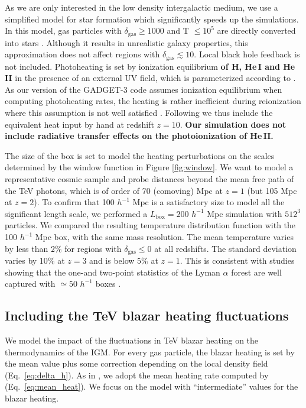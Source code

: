 \documentclass[numberedappendix]{emulateapj}
\newcommand\ALc[1]{{\color{red} \bf #1}} %
\begin{document}
As we are only interested in the low density intergalactic medium, we use a simplified model for star formation which significantly speeds up the simulations. In this model, gas particles with $\delta_{\mathrm{gas}}\geq 1000$ and T $\leq 10^5$ are directly converted into stars \citep{2004MNRAS.354..684V}. Although it results in unrealistic galaxy properties, this approximation does not affect regions with $\delta_{\mathrm{gas}} \lesssim 10$. Local black hole feedback is not included. Photoheating is set by ionization equilibrium \ALc{of H, He\,\textsc{I} and He\,\textsc{II}} in the presence of an external UV field, which is parameterized according to \citet{2009ApJ...703.1416F}. As our version of the \textsc{GADGET-3} code assumes ionization equilibrium when computing photoheating rates, the heating is rather inefficient during reionization where this assumption is not well satisfied \citep[see e.g.][]{2014arXiv1410.1531P}. Following \citet{2012MNRAS.423..149P} we thus include the equivalent heat input by hand at redshift $z=10$. \ALc{Our simulation does not include radiative transfer effects on the photoionization of He\,\textsc{II}.}

The size of the box is set to model the heating perturbations on the scales determined by the window function in Figure \ref{fig:window}. We want to model a representative cosmic sample and probe distances beyond the mean free path of the TeV photons, which is of order of 70 (comoving) Mpc at $z=1$ (but 105 Mpc at $z=2$). To confirm that 100 $h^{-1}$ Mpc is a satisfactory size to model all the significant length scale, we performed a $L_\mathrm{box}=200 $ $h^{-1}$ Mpc simulation with $512^3$ particles. We compared the resulting temperature distribution function with the 100 $h^{-1}$ Mpc box, with the same mass resolution. The mean temperature varies by less than $2\%$ for regions with $\delta_{\mathrm{gas}}\leqslant 0$ at all redshifts. The standard deviation varies by 10$\%$ at $z=3$ and is below $5\%$ at $z=1$. This is consistent with studies showing that the one-and two-point statistics of the Lyman $\alpha$ forest are well captured with $\simeq 50$ $h^{-1}$ boxes \citep{2007MNRAS.374..196R,2009MNRAS.398L..26B}.
\subsection{Including the TeV blazar heating fluctuations}
We model the impact of the fluctuations in TeV blazar heating on the thermodynamics of the IGM. For every gas particle, the blazar heating is set by the mean value plus some correction depending on the local density field (Eq.~\eqref{eq:delta_h}). As in \citet{2012MNRAS.423..149P}, we adopt the mean heating rate computed by \citet{2012ApJ...752...23C} (Eq.~\eqref{eq:mean_heat}). We focus on the model with ``intermediate'' values for the blazar heating.
\end{document}
